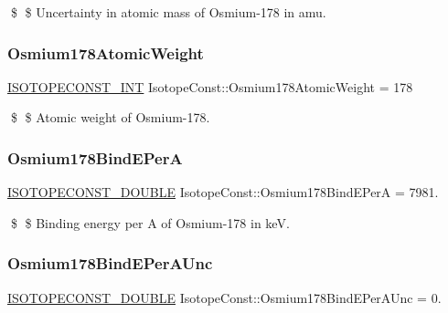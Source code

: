 \$ \$ Uncertainty in atomic mass of Osmium-\/178 in amu. \mbox{\label{group___isotope_const-_osmium-_os178_ga2e560eb5c1f3d6c7be15adb9d0736395}} 
\subsubsection{\texorpdfstring{Osmium178\+Atomic\+Weight}{Osmium178AtomicWeight}}
{\footnotesize\ttfamily \mbox{\hyperlink{group___isotope_const-_macros_ga5f18360b3e99483a35c32d789e62621c}{I\+S\+O\+T\+O\+P\+E\+C\+O\+N\+S\+T\+\_\+\+I\+NT}} Isotope\+Const\+::\+Osmium178\+Atomic\+Weight = 178}

\$ \$ Atomic weight of Osmium-\/178. \mbox{\label{group___isotope_const-_osmium-_os178_ga83a95839ff5a6244e7f753bb9f652c50}} 
\subsubsection{\texorpdfstring{Osmium178\+Bind\+E\+PerA}{Osmium178BindEPerA}}
{\footnotesize\ttfamily \mbox{\hyperlink{group___isotope_const-_macros_ga8f45a7272ce02c0b4c65c44636ed719a}{I\+S\+O\+T\+O\+P\+E\+C\+O\+N\+S\+T\+\_\+\+D\+O\+U\+B\+LE}} Isotope\+Const\+::\+Osmium178\+Bind\+E\+PerA = 7981.}

\$ \$ Binding energy per A of Osmium-\/178 in keV. \mbox{\label{group___isotope_const-_osmium-_os178_gaa77fdc4bafae6fa12e1ec968f3695aed}} 
\subsubsection{\texorpdfstring{Osmium178\+Bind\+E\+Per\+A\+Unc}{Osmium178BindEPerAUnc}}
{\footnotesize\ttfamily \mbox{\hyperlink{group___isotope_const-_macros_ga8f45a7272ce02c0b4c65c44636ed719a}{I\+S\+O\+T\+O\+P\+E\+C\+O\+N\+S\+T\+\_\+\+D\+O\+U\+B\+LE}} Isotope\+Const\+::\+Osmium178\+Bind\+E\+Per\+A\+Unc = 0.}

